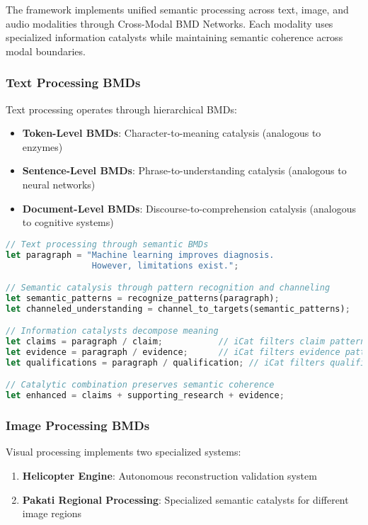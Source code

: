 \documentclass[12pt,a4paper,twoside]{article}
\begin{document}
\begin{itemize}
The framework implements unified semantic processing across text, image, and audio modalities through Cross-Modal BMD Networks. Each modality uses specialized information catalysts while maintaining semantic coherence across modal boundaries.

\subsubsection{Text Processing BMDs}

Text processing operates through hierarchical BMDs:

\begin{itemize}
\item \textbf{Token-Level BMDs}: Character-to-meaning catalysis (analogous to enzymes)
\item \textbf{Sentence-Level BMDs}: Phrase-to-understanding catalysis (analogous to neural networks)
\item \textbf{Document-Level BMDs}: Discourse-to-comprehension catalysis (analogous to cognitive systems)
\end{itemize}

\begin{lstlisting}[language=rust,caption=Text BMD Processing]
// Text processing through semantic BMDs
let paragraph = "Machine learning improves diagnosis.
                 However, limitations exist.";

// Semantic catalysis through pattern recognition and channeling
let semantic_patterns = recognize_patterns(paragraph);
let channeled_understanding = channel_to_targets(semantic_patterns);

// Information catalysts decompose meaning
let claims = paragraph / claim;           // iCat filters claim patterns
let evidence = paragraph / evidence;      // iCat filters evidence patterns
let qualifications = paragraph / qualification; // iCat filters qualification patterns

// Catalytic combination preserves semantic coherence
let enhanced = claims + supporting_research + evidence;
\end{lstlisting}

\subsubsection{Image Processing BMDs}

Visual processing implements two specialized systems:

\begin{enumerate}
\item \textbf{Helicopter Engine}: Autonomous reconstruction validation system
\item \textbf{Pakati Regional Processing}: Specialized semantic catalysts for different image regions
\end{enumerate}


\end{itemize}
\end{document}
